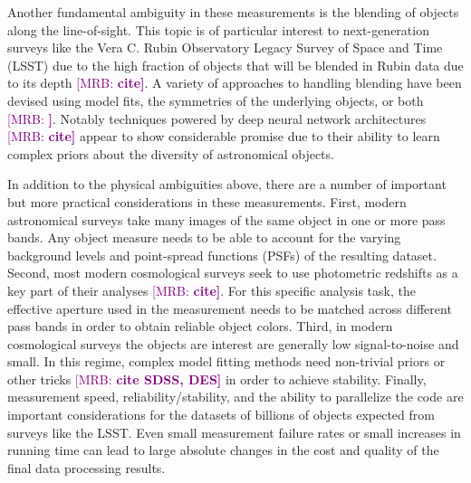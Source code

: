 \documentclass[twocolappendix, appendixfloats, numberedappendix, twocolumn, apj]{openjournal}
\newcommand{\mrb}[1]{\textcolor{purple}{[MRB: \bf #1]}\xspace}
\begin{document}
Another fundamental ambiguity in these measurements is the blending of objects along the line-of-sight. This topic
is of particular interest to next-generation surveys like the Vera C. Rubin Observatory
Legacy Survey of Space and Time (LSST) due to the high fraction of objects that will be blended in Rubin
data due to its depth \mrb{cite}. A variety of approaches to handling blending have been devised using
model fits, the symmetries of the underlying objects, or both \mrb{}. Notably techniques powered by deep
neural network architectures \mrb{cite} appear to show considerable promise due to their ability to learn
complex priors about the diversity of astronomical objects.

In addition to the physical ambiguities above, there are a number of important but more practical considerations in these measurements. First,
modern astronomical surveys take many images of the same object in one or more pass bands. Any object
measure needs to be able to account for the varying background levels and point-spread functions (PSFs)
of the resulting dataset. Second, most modern cosmological surveys seek to use photometric redshifts as a
key part of their analyses \mrb{cite}. For this specific analysis task, the effective aperture used in the
measurement needs to be matched across different pass bands in order to obtain reliable object colors. Third,
in modern cosmological surveys the objects are interest are generally low signal-to-noise and small. In this
regime, complex model fitting methods need non-trivial priors or other tricks \mrb{cite SDSS, DES} in order
to achieve stability. Finally, measurement speed, reliability/stability, and the ability to parallelize the
code are important considerations for the datasets of billions of objects expected from surveys like the LSST.
Even small measurement failure rates or small increases in running time can lead to large absolute changes
in the cost and quality of the final data processing results.
\end{document}
